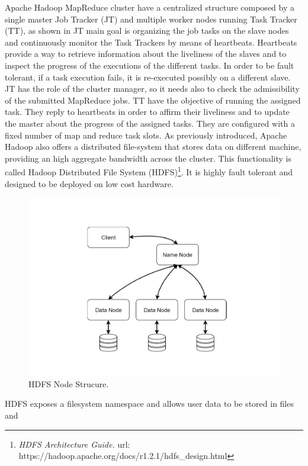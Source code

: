 Apache Hadoop MapReduce cluster have a centralized structure
composed by a single master Job Tracker (JT) and multiple worker nodes running Task Tracker (TT), as shown in   JT main goal
is organizing the job tasks on the slave nodes and continuously monitor
the Task Trackers by means of heartbeats. Heartbeats provide a way to retrieve information about the liveliness of the slaves and to
inspect the progress of the executions of the different tasks. In order
to be fault tolerant, if a task execution fails, it is re-executed possibly
on a different slave. JT has the role of the cluster manager, so it
needs also to check the admissibility of the submitted MapReduce
jobs. TT have the objective of running the assigned task. They reply to
heartbeats in order to affirm their liveliness and to update the master
about the progress of the assigned tasks. They are configured with a
fixed number of map and reduce task slots.
As previously introduced, Apache Hadoop also offers a distributed file-system that stores data on different machine, 
providing an high aggregate bandwidth across the cluster. This functionality is called Hadoop Distributed File System (HDFS)\footnote{\textit{HDFS Architecture Guide.} url:  https://hadoop.apache.org/docs/r1.2.1/hdfs\_design.html}. 
It is highly fault tolerant and designed to be deployed on low cost hardware.
\begin{figure}
	\centering
	\includegraphics[width=\columnwidth]{Images/hdfs_1.pdf}  
	\caption[HDFS Node Strucure]{HDFS Node Strucure.}
	\label{fig:hdfsNodeStruct}
\end{figure}
HDFS exposes a filesystem namespace and allows user data to be stored in files and
